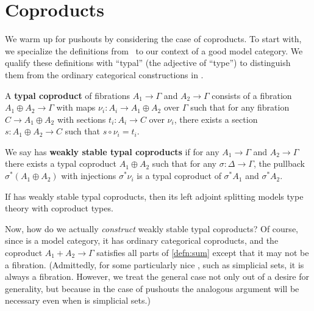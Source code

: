 \documentclass{amsart}
\let\sec\S
\let\S\cS
\begin{document}
\section{Coproducts}
\label{sec:coproducts}

We warm up for pushouts by considering the case of coproducts.
To start with, we specialize the definitions from~\cite[\sec3.4.1]{lw:localuniv} to our context of a good model category.
We qualify these definitions with ``typal'' (the adjective of ``type'') to distinguish them from the ordinary categorical constructions in \sM.

\begin{defn}\label{defn:sum}
  A \textbf{typal coproduct} of fibrations $A_1\to \Gamma$ and $A_2\to\Gamma$ consists of a fibration $A_1\oplus A_2 \to\Gamma$ with maps $\nu_i: A_i \to A_1\oplus A_2$ over $\Gamma$ such that for any fibration $C\to A_1\oplus A_2$ with sections $t_i : A_i \to C$ over $\nu_i$, there exists a section $s:A_1\oplus A_2 \to C$ such that $s\circ \nu_i = t_i$.

  We say \sM has \textbf{weakly stable typal coproducts} if for any $A_1\to \Gamma$ and $A_2\to\Gamma$ there exists a typal coproduct $A_1\oplus A_2$ such that for any $\sigma:\Delta\to\Gamma$, the pullback $\sigma^*(A_1\oplus A_2)$ with injections $\sigma^*\nu_i$ is a typal coproduct of $\sigma^*A_1$ and $\sigma^* A_2$.
\end{defn}

\begin{thm}
  If \sM has weakly stable typal coproducts, then its left adjoint splitting models type theory with coproduct types.
\end{thm}

Now, how do we actually \emph{construct} weakly stable typal coproducts?
Of course, since \sM is a model category, it has ordinary categorical coproducts, and the coproduct $A_1 + A_2 \to \Gamma$ satisfies all parts of \cref{defn:sum} except that it may not be a fibration.
(Admittedly, for some particularly nice \sM, such as simplicial sets, it is always a fibration.
However, we treat the general case not only out of a desire for generality, but because in the case of pushouts the analogous argument will be necessary even when \sM is simplicial sets.)
\end{document}
